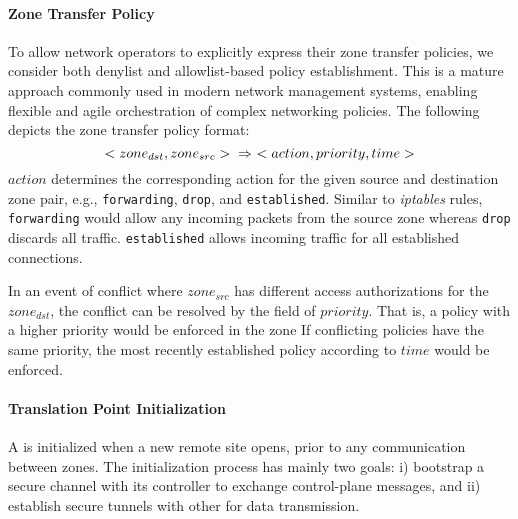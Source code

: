 \paragraph{Zone Transfer Policy}
To allow network operators to explicitly express their zone transfer policies, we 
consider both denylist and allowlist-based policy establishment. 
This is a
mature approach commonly used in modern network management systems, enabling flexible
and agile orchestration of complex networking policies. The following depicts the
zone transfer policy format:
\noindent 
\begin{equation}
	<zone_{dst}, zone_{src}> \\ 
	\Rightarrow~<action, priority, time>
	\label{eq:policy}
\end{equation}
\noindent 
$action$ determines the corresponding action for the given source and destination
zone pair, e.g., \texttt{forwarding}, \texttt{drop}, and \texttt{established}. Similar
to \textit{iptables} rules, \texttt{forwarding} would allow any incoming packets from
the source zone whereas \texttt{drop} discards all traffic. \texttt{established} allows
incoming traffic for all established connections. 

In an event of conflict where $zone_{src}$ has different
access authorizations for the $zone_{dst}$, the conflict can be resolved by the field 
of $priority$. That is, a policy with a higher priority would be enforced in the zone 
If conflicting policies have the same priority, the most recently established policy 
according to $time$ would be enforced.


\paragraph{Translation Point Initialization} %
A \tp is initialized when a new remote site opens, prior to any communication between
zones. The initialization process has mainly two goals: i) bootstrap a secure channel 
with its controller to exchange control-plane messages, and ii) establish secure tunnels 
with other \tps for data transmission.

